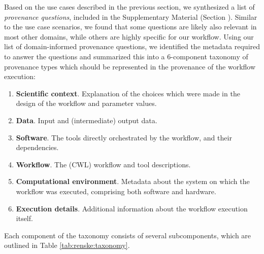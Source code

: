 \label{sec:renske:user_req}

Based on the use cases described in the previous section, we synthesized a list of \emph{provenance questions}, included in the Supplementary Material (Section \emph{}).
Similar to the use case scenarios, we found that some questions are likely also relevant in most other domains, while others are highly specific for our workflow. Using our list of domain-informed provenance questions, we identified the metadata required to answer the questions and summarized this into a 6-component taxonomy of provenance types which should be represented in the provenance of the workflow execution: 


\begin{enumerate}[label=\textbf{T\arabic*}]
    \item \textbf{Scientific context}. Explanation of the choices which were made in the design of the workflow and parameter values. \label{renske:tax:context}
    \item \textbf{Data}. Input and (intermediate) output data.\label{renske:tax:data} %
    \item \textbf{Software}. The tools directly orchestrated by the workflow, and their dependencies. \label{renske:tax:software} %
    \item \textbf{Workflow}. The (CWL) workflow and tool descriptions. \label{renske:tax:wf} %
    \item \textbf{Computational environment}. Metadata about the system on which the workflow was executed, comprising both software and hardware. \label{renske:tax:env} %
    \item \textbf{Execution details}. Additional information about the workflow execution itself. \label{renske:tax:execution}
\end{enumerate}

Each component of the taxonomy consists of several subcomponents, which are outlined in Table \ref{tab:renske:taxonomy}.

